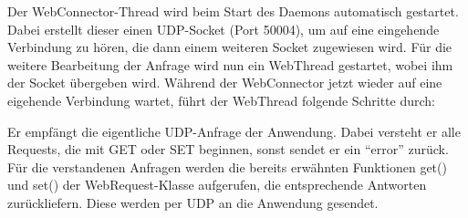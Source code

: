 \documentclass[a4paper,14pt,headsepline]{scrartcl}
\begin{document}
\begin{figure}[h]
\begin{center}
\end{center}
\end{figure}

\newpage
Der WebConnector-Thread wird beim Start des Daemons automatisch gestartet. Dabei erstellt dieser einen UDP-Socket (Port 50004), um auf eine eingehende Verbindung zu hören, die dann einem weiteren Socket zugewiesen wird. Für die weitere Bearbeitung der Anfrage wird nun ein WebThread gestartet, wobei ihm der Socket übergeben wird. Während der WebConnector jetzt wieder auf eine eigehende Verbindung wartet, führt der WebThread folgende Schritte durch:

Er empfängt die eigentliche UDP-Anfrage der Anwendung. Dabei versteht er alle Requests, die mit GET oder SET beginnen, sonst sendet er ein ``error'' zurück. Für die verstandenen Anfragen werden die bereits erwähnten Funktionen get() und set() der WebRequest-Klasse aufgerufen, die entsprechende Antworten zurückliefern. Diese werden per UDP an die Anwendung gesendet. 
\end{document}
